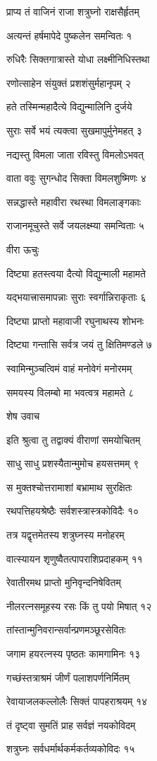 प्राप्य तं वाजिनं राजा शत्रुघ्नो राक्षसैर्हृतम्

अत्यन्तं हर्षमापेदे पुष्कलेन समन्वितः १

रुधिरैः सिक्तगात्रास्ते योधा लक्ष्मीनिधिस्तथा

रणोत्साहेन संयुक्तं प्रशशंसुर्महानृपम् २

हते तस्मिन्महादैत्ये विद्युन्मालिनि दुर्जये

सुराः सर्वे भयं त्यक्त्वा सुखमापुर्मुनेमहत् ३

नद्यस्तु विमला जाता रविस्तु विमलोऽभवत्

वाता ववुः सुगन्धोद सिक्ता विमलशुष्मिणः ४

सन्नद्धास्ते महावीरा रथस्था विमलाङ्गकाः

राजानमूचुस्ते सर्वे जयलक्ष्म्या समन्विताः ५

वीरा ऊचुः

दिष्ट्या हतस्त्वया दैत्यो विद्युन्माली महामते

यद्भयात्त्रासमापन्नाः सुराः स्वर्गान्निराकृताः ६

दिष्ट्या प्राप्तो महावाजी रघुनाथस्य शोभनः

दिष्ट्या गन्तासि सर्वत्र जयं तु क्षितिमण्डले ७

स्वामिन्मुञ्चत्विमं वाहं मनोवेगं मनोरमम्

समयस्य विलम्बो मा भवत्वत्र महामते ८

शेष उवाच

इति श्रुत्वा तु तद्वाक्यं वीराणां समयोचितम्

साधु साधु प्रशस्यैतान्मुमोच हयसत्तमम् ९

स मुक्तश्चोत्तरामाशां बभ्रामाथ सुरक्षितः

रथपत्तिहयश्रेष्ठैः सर्वशस्त्रास्त्रकोविदैः १०

तत्र यद्वृत्तमेतस्य शत्रुघ्नस्य मनोहरम्

वात्स्यायन शृणुष्वैतत्पापराशिप्रदाहकम् ११

रेवातीरमथ प्राप्तो मुनिवृन्दनिषेवितम्

नीलरत्नसमूहस्य रसः किं तु पयो मिषात् १२

तांस्तान्मुनिवरान्सर्वान्प्रणमञ्छूरसेवितः

जगाम हयरत्नस्य पृष्ठतः कामगामिनः १३

गच्छंस्तत्राश्रमं जीर्णं पलाशपर्णनिर्मितम्

रेवायाजलकल्लोलैः सिक्तं पापहराश्रयम् १४

तं दृष्ट्वा सुमतिं प्राह सर्वज्ञं नयकोविदम्

शत्रुघ्नः सर्वधर्मार्थकर्मकर्तव्यकोविदः १५

